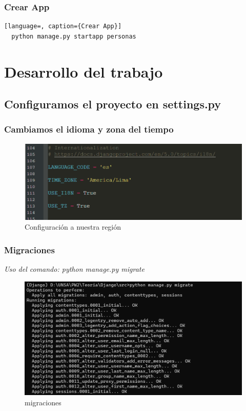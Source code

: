 \documentclass{article}
\begin{document}
  \subsubsection{Crear App}
  \begin{lstlisting}[language=, caption={Crear App}]
  python manage.py startapp personas
  \end{lstlisting}
  \newpage


  \section{Desarrollo del trabajo}
 
 
  \subsection{Configuramos el proyecto en settings.py}
  

  \subsubsection{Cambiamos el idioma y zona del tiempo}
  \begin{figure}[H]
    \centering
    \includegraphics[width=1\textwidth, keepaspectratio]{img/lenguaje.png}
    \caption{Configuración a nuestra región}
  \end{figure}


  \subsubsection{Migraciones}
  \textit{Uso del comando: python manage.py migrate}
  \begin{figure}[H]
    \centering
    \includegraphics[width=1\textwidth, keepaspectratio]{img/migraciones.png}
    \caption{migraciones}
  \end{figure}
  \newpage
  
\end{document}

